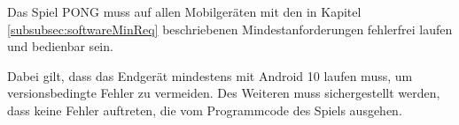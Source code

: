 Das Spiel PONG \gls{muss} auf allen Mobilgeräten mit den in Kapitel \ref{subsubsec:softwareMinReq}
beschriebenen Mindestanforderungen fehlerfrei laufen und bedienbar sein.

Dabei gilt, dass das Endgerät mindestens mit Android 10 laufen \gls{muss},
um versionsbedingte Fehler zu vermeiden. Des Weiteren \gls{muss} sichergestellt werden,
dass keine Fehler auftreten, die vom Programmcode des Spiels ausgehen.
